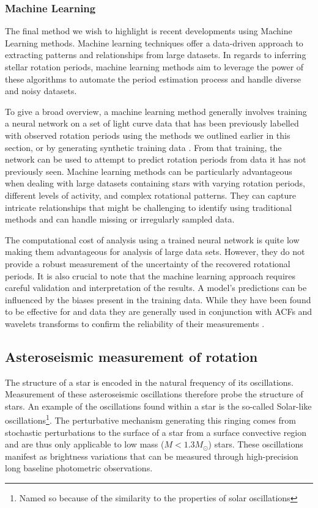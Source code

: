 \subsubsection*{Machine Learning}
The final method we wish to highlight is recent developments using Machine Learning methods.
Machine learning techniques offer a data-driven approach to extracting patterns and relationships from large datasets.
In regards to inferring stellar rotation periods, machine learning methods aim to leverage the power of these algorithms to automate the period estimation process and handle diverse and noisy datasets.

To give a broad overview, a machine learning method generally involves training a neural network on a set of light curve data that has been previously labelled with observed rotation periods using the methods we outlined earlier in this section, or by generating synthetic training data \citep{claytor_recovery_2022}.
From that training, the network can be used to attempt to predict rotation periods from data it has not previously seen.
Machine learning methods can be particularly advantageous when dealing with large datasets containing stars with varying rotation periods, different levels of activity, and complex rotational patterns. 
They can capture intricate relationships that might be challenging to identify using traditional methods and can handle missing or irregularly sampled data.

The computational cost of analysis using a trained neural network is quite low making them advantageous for analysis of large data sets.
However, they do not provide a robust measurement of the uncertainty of the recovered rotational periods.
It is also crucial to note that the machine learning approach requires careful validation and interpretation of the results.
A model's predictions can be influenced by the biases present in the training data.
While they have been found to be effective for \tess{} and \kepler{} data they are generally used in conjunction with ACFs and wavelets transforms to confirm the reliability of their measurements \citep{claytor_recovery_2022, santos_surface_2021}.


\subsection{Asteroseismic measurement of rotation}

The structure of a star is encoded in the natural frequency of its oscillations.
Measurement of these asteroseismic oscillations therefore probe the structure of stars.
An example of the oscillations found within a star is the so-called Solar-like oscillations\footnote{Named so because of the similarity to the properties of solar oscillations}. 
The perturbative mechanism generating this ringing comes from stochastic perturbations to the surface of a star from a surface convective region and are thus only applicable to low mass ($M< 1.3M_{\odot}$) stars.
These oscillations manifest as brightness variations that can be measured through high-precision long baseline photometric observations.

